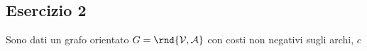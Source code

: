 \documentclass[\main/main.tex]{subfiles}
\begin{document}
\subsection{Esercizio 2}
Sono dati un grafo orientato $G = \rnd{\mathcal{V}, \mathcal{A}}$ con costi non negativi sugli archi, $c$
\end{document}
